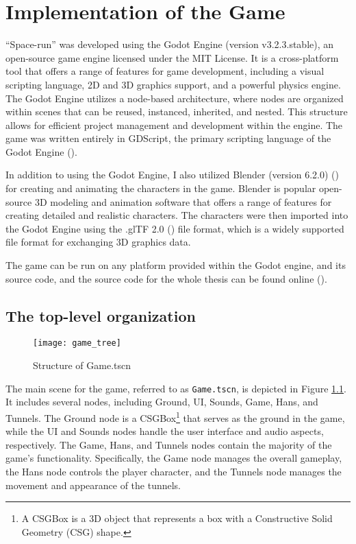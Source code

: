 \chapter{Implementation of the Game}
``Space-run'' was developed using the Godot Engine (version v3.2.3.stable), an open-source game engine licensed under the MIT License. It is a cross-platform tool that offers a range of features for game development, including a visual scripting language, 2D and 3D graphics support, and a powerful physics engine. The Godot Engine utilizes a node-based architecture, where nodes are organized within scenes that can be reused, instanced, inherited, and nested. This structure allows for efficient project management and development within the engine. The game was written entirely in GDScript, the primary scripting language of the Godot Engine (\cite{GodotDocs}).

In addition to using the Godot Engine, I also utilized Blender (version 6.2.0) (\cite{blender}) for creating and animating the characters in the game. Blender is popular open-source 3D modeling and animation software that offers a range of features for creating detailed and realistic characters. The characters were then imported into the Godot Engine using the .glTF 2.0 (\cite{gltf}) file format, which is a widely supported file format for exchanging 3D graphics data.

The game can be run on any platform provided within the Godot engine, and its source code, and the source code for the whole thesis can be found online (\cite{spacerunai}).

\section{The top-level organization}
\begin{figure}[h]
    \centering
    \texttt{[image: game\_tree]}
    \caption{Structure of Game.tscn}
    \label{fig:game_tree}
\end{figure}

The main scene for the game, referred to as \texttt{Game.tscn}, is depicted in Figure \ref{fig:game_tree}. It includes several nodes, including Ground, UI, Sounds, Game, Hans, and Tunnels. The Ground node is a CSGBox\footnote{A CSGBox is a 3D object that represents a box with a Constructive Solid Geometry (CSG) shape.} that serves as the ground in the game, while the UI and Sounds nodes handle the user interface and audio aspects, respectively. The Game, Hans, and Tunnels nodes contain the majority of the game's functionality. Specifically, the Game node manages the overall gameplay, the Hans node controls the player character, and the Tunnels node manages the movement and appearance of the tunnels.

